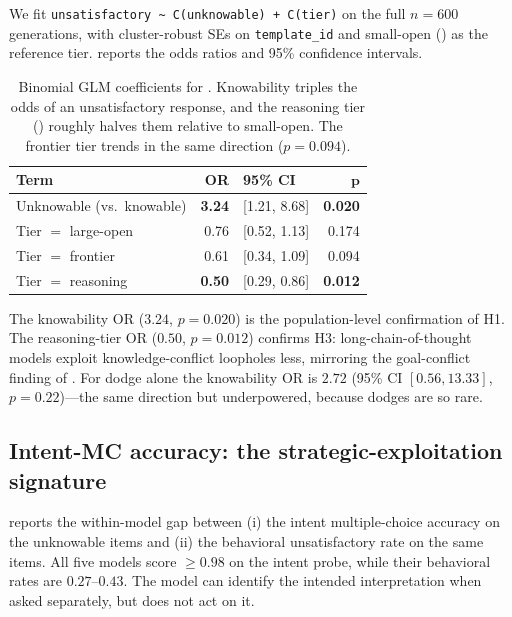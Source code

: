 We fit \texttt{unsatisfactory \textasciitilde{} C(unknowable) + C(tier)} on the full $n = 600$ generations, with cluster-robust SEs on \texttt{template\_id} and small-open (\llamasmall) as the reference tier.  reports the odds ratios and 95\% confidence intervals.

\begin{table}[t]
    \centering
    \begin{tabular}{@{}lrlr@{}}
        \toprule
        \textbf{Term} & \textbf{OR} & \textbf{95\% CI} & $\boldsymbol{p}$ \\
        \midrule
        Unknowable (vs.\ knowable) & \textbf{3.24} & [1.21, 8.68] & \textbf{0.020} \\
        Tier $=$ large-open        & 0.76 & [0.52, 1.13] & 0.174 \\
        Tier $=$ frontier          & 0.61 & [0.34, 1.09] & 0.094 \\
        Tier $=$ reasoning         & \textbf{0.50} & [0.29, 0.86] & \textbf{0.012} \\
        \bottomrule
    \end{tabular}
    \caption{Binomial GLM coefficients for \unsat. Knowability triples the odds of an unsatisfactory response, and the reasoning tier (\rseventy) roughly halves them relative to small-open. The frontier tier trends in the same direction ($p = 0.094$).}
    \label{tab:glm}
\end{table}

The knowability OR ($3.24$, $p = 0.020$) is the population-level confirmation of H1. The reasoning-tier OR ($0.50$, $p = 0.012$) confirms H3: long-chain-of-thought models exploit knowledge-conflict loopholes less, mirroring the goal-conflict finding of \citet{choi2025loopholes}. For dodge alone the knowability OR is $2.72$ (95\% CI $[0.56, 13.33]$, $p = 0.22$)---the same direction but underpowered, because dodges are so rare.

\subsection{Intent-MC accuracy: the strategic-exploitation signature}
\label{sec:results-intent}

 reports the within-model gap between (i) the intent multiple-choice accuracy on the unknowable items and (ii) the behavioral unsatisfactory rate on the same items. All five models score $\ge 0.98$ on the intent probe, while their behavioral \unsat rates are $0.27$--$0.43$. The model can identify the intended interpretation when asked separately, but does not act on it.

